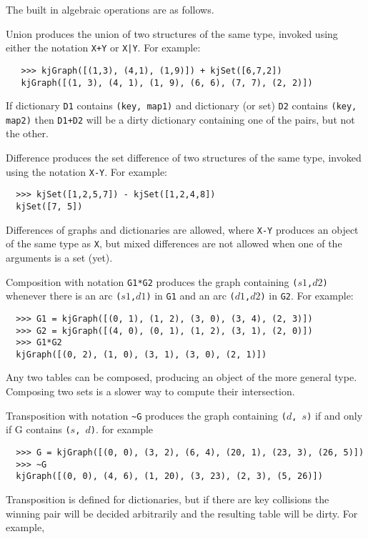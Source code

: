 The built in algebraic operations are as follows.
\begin{description}
\item{Union}
produces the union of two structures of the same type, invoked
using either the notation {\tt X+Y} or {\tt X|Y}.  For example:
\begin{verbatim}
   >>> kjGraph([(1,3), (4,1), (1,9)]) + kjSet([6,7,2])
   kjGraph([(1, 3), (4, 1), (1, 9), (6, 6), (7, 7), (2, 2)])
\end{verbatim}
If dictionary {\tt D1} contains {\tt (key, map1)} and
dictionary (or set) {\tt D2} contains {\tt (key, map2)} then
{\tt D1+D2} will be a dirty dictionary containing
one of the pairs, but not the
other.
\item{Difference}
produces the set difference of two structures of the same type,
invoked using the notation {\tt X-Y}.  For example:
\begin{verbatim}
  >>> kjSet([1,2,5,7]) - kjSet([1,2,4,8])
  kjSet([7, 5])
\end{verbatim}
Differences of graphs and dictionaries are allowed, where
{\tt X-Y} produces an object of the same type as {\tt X},
but mixed differences are not allowed when one of the arguments
is a set (yet).
\item{Composition}
with notation {\tt G1*G2} produces the graph containing
{\tt ($s1$,$d2$)} whenever there is an arc
{\tt ($s1$,$d1$)} in {\tt G1} and an arc
{\tt ($d1$,$d2$)} in {\tt G2}.  For example:
\begin{verbatim}
  >>> G1 = kjGraph([(0, 1), (1, 2), (3, 0), (3, 4), (2, 3)])
  >>> G2 = kjGraph([(4, 0), (0, 1), (1, 2), (3, 1), (2, 0)])
  >>> G1*G2
  kjGraph([(0, 2), (1, 0), (3, 1), (3, 0), (2, 1)])
\end{verbatim}
Any two tables can be composed, producing an object of the
more general type.  Composing two sets is a slower way to
compute their intersection.
\item{Transposition}
with notation \verb+~G+ produces the graph containing
{\tt ($d$, $s$)} if and only if G contains {\tt ($s$, $d$)}.
for example
\begin{verbatim}
  >>> G = kjGraph([(0, 0), (3, 2), (6, 4), (20, 1), (23, 3), (26, 5)])
  >>> ~G
  kjGraph([(0, 0), (4, 6), (1, 20), (3, 23), (2, 3), (5, 26)])
\end{verbatim}
Transposition is defined for dictionaries, but 
if there are key collisions the winning pair will be decided
arbitrarily and the resulting table will be dirty.
For example,
\begin{verbatim}

\end{verbatim}
\end{description}
